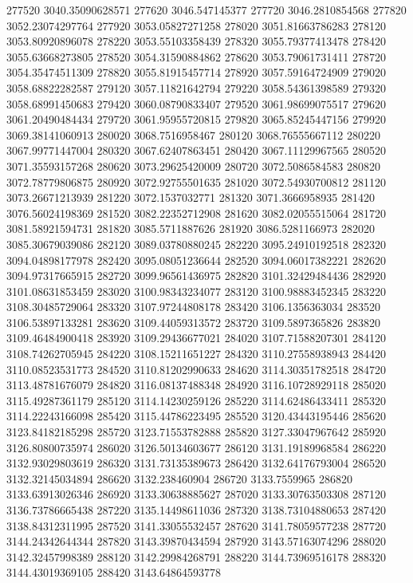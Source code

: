 {277520 3040.35090628571
277620 3046.547145377
277720 3046.2810854568
277820 3052.23074297764
277920 3053.05827271258
278020 3051.81663786283
278120 3053.80920896078
278220 3053.55103358439
278320 3055.79377413478
278420 3055.63668273805
278520 3054.31590884862
278620 3053.79061731411
278720 3054.35474511309
278820 3055.81915457714
278920 3057.59164724909
279020 3058.68822282587
279120 3057.11821642794
279220 3058.54361398589
279320 3058.68991450683
279420 3060.08790833407
279520 3061.98699075517
279620 3061.20490484434
279720 3061.95955720815
279820 3065.85245447156
279920 3069.38141060913
280020 3068.7516958467
280120 3068.76555667112
280220 3067.99771447004
280320 3067.62407863451
280420 3067.11129967565
280520 3071.35593157268
280620 3073.29625420009
280720 3072.5086584583
280820 3072.78779806875
280920 3072.92755501635
281020 3072.54930700812
281120 3073.26671213939
281220 3072.1537032771
281320 3071.3666958935
281420 3076.56024198369
281520 3082.22352712908
281620 3082.02055515064
281720 3081.58921594731
281820 3085.5711887626
281920 3086.5281166973
282020 3085.30679039086
282120 3089.03780880245
282220 3095.24910192518
282320 3094.04898177978
282420 3095.08051236644
282520 3094.06017382221
282620 3094.97317665915
282720 3099.96561436975
282820 3101.32429484436
282920 3101.08631853459
283020 3100.98343234077
283120 3100.98883452345
283220 3108.30485729064
283320 3107.97244808178
283420 3106.1356363034
283520 3106.53897133281
283620 3109.44059313572
283720 3109.5897365826
283820 3109.46484900418
283920 3109.29436677021
284020 3107.71588207301
284120 3108.74262705945
284220 3108.15211651227
284320 3110.27558938943
284420 3110.08523531773
284520 3110.81202990633
284620 3114.30351782518
284720 3113.48781676079
284820 3116.08137488348
284920 3116.10728929118
285020 3115.49287361179
285120 3114.14230259126
285220 3114.62486433411
285320 3114.22243166098
285420 3115.44786223495
285520 3120.43443195446
285620 3123.84182185298
285720 3123.71553782888
285820 3127.33047967642
285920 3126.80800735974
286020 3126.50134603677
286120 3131.19189968584
286220 3132.93029803619
286320 3131.73135389673
286420 3132.64176793004
286520 3132.32145034894
286620 3132.238460904
286720 3133.7559965
286820 3133.63913026346
286920 3133.30638885627
287020 3133.30763503308
287120 3136.73786665438
287220 3135.14498611036
287320 3138.73104880653
287420 3138.84312311995
287520 3141.33055532457
287620 3141.78059577238
287720 3144.24342644344
287820 3143.39870434594
287920 3143.57163074296
288020 3142.32457998389
288120 3142.29984268791
288220 3144.73969516178
288320 3144.43019369105
288420 3143.64864593778
}

